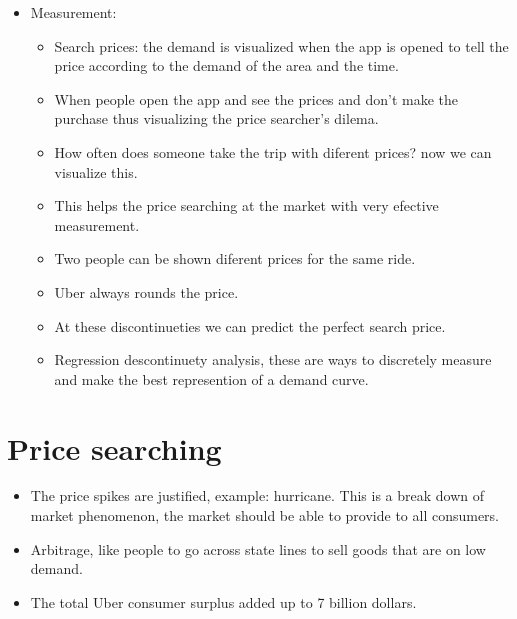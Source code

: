 \documentclass{article}
\begin{document}
\begin{itemize}
\begin{itemize}
            \item Measurement:
                \begin{itemize}
                    \item Search prices: the demand is visualized when the app is opened to tell the price according to the demand of the area and the time.
                    \item When people open the app and see the prices and don't make the purchase thus visualizing the price searcher's dilema.
                    \item How often does someone take the trip with diferent prices? now we can visualize this.
                    \item This helps the price searching at the market with very efective measurement.
                    \item Two people can be shown diferent prices for the same ride.
                    \item Uber always rounds the price.
                    \item At these discontinueties we can predict the perfect search price.
                    \item Regression descontinuety analysis, these are ways to discretely measure and make the best represention of a demand curve.
                \end{itemize}
        \end{itemize}
\end{itemize}


\section{Price searching}
\begin{itemize}
    \item The price spikes are justified, example: hurricane. This is a break down of market phenomenon, the market should be able to provide to all consumers. 
    \item Arbitrage, like people to go across state lines to sell goods that are on low demand.
    \item The total Uber consumer surplus added up to 7 billion dollars.
\end{itemize}

\end{document}
